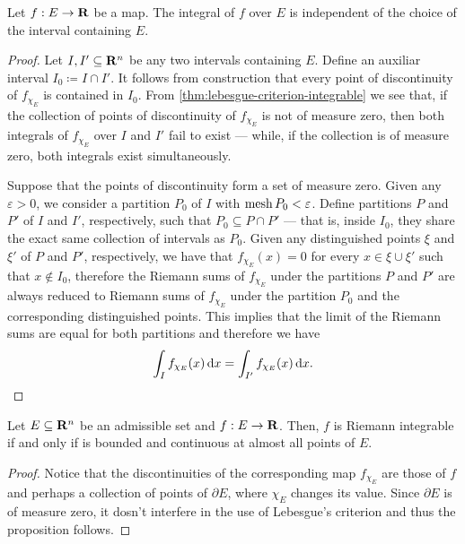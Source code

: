 \begin{lemma}
\label{lem:integral-well-defined}
Let \(f: E \to \mathbf{R}\) be a map. The integral of \(f\) over \(E\) is independent of
the choice of the interval containing \(E\).
\end{lemma}

\begin{proof}
Let \(I, I' \subseteq \mathbf{R}^n\) be any two intervals containing \(E\). Define an
auxiliar interval \(I_0 \coloneq I \cap I'\). It follows from construction that
every point of discontinuity of \(f_{\chi_E}\) is contained in \(I_0\). From
\cref{thm:lebesgue-criterion-integrable} we see that, if the collection of
points of discontinuity of \(f_{\chi_E}\) is not of measure zero, then both
integrals of \(f_{\chi_E}\) over \(I\) and \(I'\) fail to exist --- while, if
the collection is of measure zero, both integrals exist simultaneously.

Suppose that the points of discontinuity form a set of measure zero. Given any
\(\varepsilon > 0\), we consider a partition \(P_0\) of \(I\) with \(\operatorname{mesh} P_0 <
\varepsilon\). Define partitions \(P\) and \(P'\) of \(I\) and \(I'\),
respectively, such that \(P_0 \subseteq P \cap P'\) --- that is, inside \(I_0\),
they share the exact same collection of intervals as \(P_0\). Given any
distinguished points \(\xi\) and \(\xi'\) of \(P\) and \(P'\), respectively,
we have that \(f_{\chi_{E}}(x) = 0\) for every \(x \in \xi \cup \xi'\) such that
\(x \not\in I_0\), therefore the Riemann sums of \(f_{\chi_E}\) under the
partitions \(P\) and \(P'\) are always reduced to Riemann sums of \(f_{\chi_E}\)
under the partition \(P_0\) and the corresponding distinguished points. This
implies that the limit of the Riemann sums are equal for both partitions and
therefore we have
\[
  \int_I f_{\chi_E}(x)\, \mathrm{d} x = \int_{I'} f_{\chi_E}(x)\, \mathrm{d} x.
\]
\end{proof}

\begin{corollary}
\label{cor:condidion-riemann-integrable-admissible-set}
Let \(E \subseteq \mathbf{R}^n\) be an admissible set and \(f: E \to \mathbf{R}\). Then, \(f\)
is Riemann integrable if and only if is bounded and continuous at almost all
points of \(E\).
\end{corollary}

\begin{proof}
Notice that the discontinuities of the corresponding map \(f_{\chi_E}\) are
those of \(f\) and perhaps a collection of points of \(\partial E\), where
\(\chi_E\) changes its value. Since \(\partial E\) is of measure zero, it dosn't
interfere in the use of Lebesgue's criterion and thus the proposition follows.
\end{proof}

